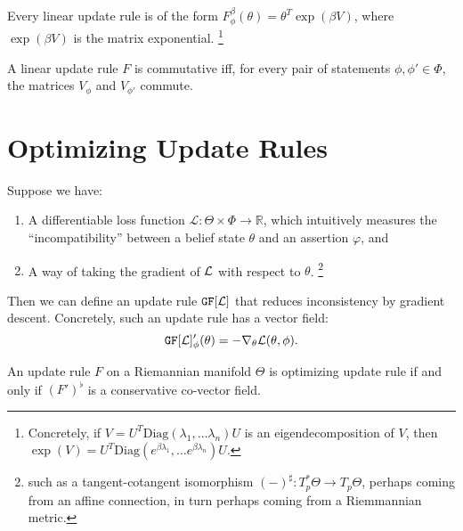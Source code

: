 \documentclass{article}
\begin{document}

\begin{prop}
	Every linear update rule is of the form
	$
		F^{\beta}_\phi(\theta) =  \theta^{T} \exp(\beta V)
	$,
	where $\exp(\beta V)$ is the matrix exponential.%
		\footnote{Concretely, if $V = U^T \mathrm{Diag}(\lambda_1, \ldots \lambda_n) U$ is an eigendecomposition of $V$, then $\exp(V) = U^T \mathrm{Diag}(e^{\beta\lambda_1}, \ldots e^{\beta\lambda_n}) U$.}
\end{prop}

\begin{prop}
	A linear update rule $F$ is commutative iff, for every pair of statements  $\phi, \phi' \in \Phi$, the
	matrices $V_\phi$ and $V_{\phi'}$ commute.
\end{prop}




\section{Optimizing Update Rules}
Suppose we have:
\begin{enumerate}[nosep]
	\item A differentiable loss function $\mathcal L : \Theta \times \Phi  \to \mathbb R$, which intuitively measures the ``incompatibility'' between a belief state $\theta$ and an assertion $\varphi$, and
	\item
		A way of taking the gradient of ${\cal L}$ with respect to $\theta$.%
			\footnote{
			such as a tangent-cotangent isomorphism $(-)^\sharp : T^*_p\Theta \to T_p \Theta$, perhaps coming from an affine connection, in turn perhaps coming from a Riemmannian metric.}
\end{enumerate}
\def\GD#1{\mathtt{GF}[#1]}
\def\NGD#1{\mathtt{NGF}[#1]}

Then we can define an update rule $\GD {\cal L}$ that reduces inconsistency by gradient descent. Concretely, such an update rule has a vector field:
\[
	\GD {\cal L}'_\phi(\theta) = - \nabla_\theta {\cal L}(\theta,\phi).
\]


\begin{prop}
	An update rule $F$ on a Riemannian manifold $\Theta$ is optimizing update rule if and only if $(F')^\flat$ is a conservative co-vector field.
	\cite[Prop 11.40]{lee2013smooth}
\end{prop}
\end{document}
